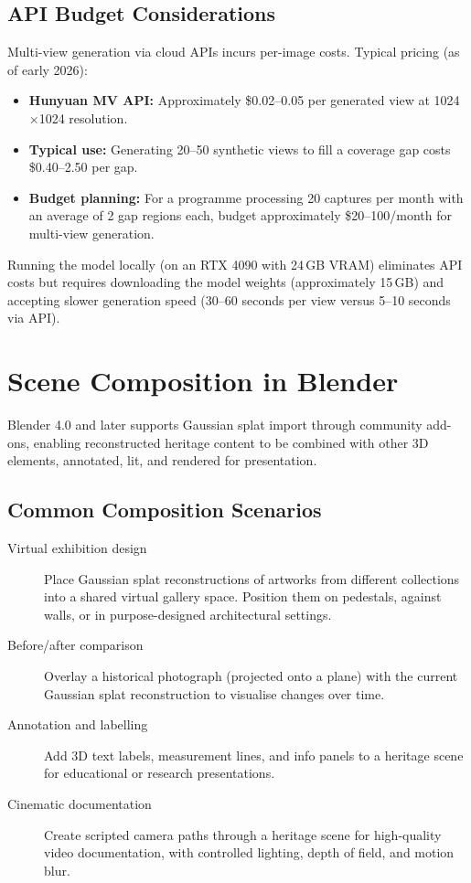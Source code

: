 \subsection{API Budget Considerations}

Multi-view generation via cloud APIs incurs per-image costs. Typical pricing (as of early 2026):

\begin{itemize}
  \item \textbf{Hunyuan MV API:} Approximately \$0.02--0.05 per generated view at 1024$\times$1024 resolution.
  \item \textbf{Typical use:} Generating 20--50 synthetic views to fill a coverage gap costs \$0.40--2.50 per gap.
  \item \textbf{Budget planning:} For a programme processing 20 captures per month with an average of 2 gap regions each, budget approximately \$20--100/month for multi-view generation.
\end{itemize}

Running the model locally (on an RTX 4090 with 24\,GB VRAM) eliminates API costs but requires downloading the model weights (approximately 15\,GB) and accepting slower generation speed (30--60 seconds per view versus 5--10 seconds via API).

\section{Scene Composition in Blender}
\label{sec:adv-blender}

Blender 4.0 and later supports Gaussian splat import through community add-ons, enabling reconstructed heritage content to be combined with other 3D elements, annotated, lit, and rendered for presentation.

\subsection{Common Composition Scenarios}

\begin{description}
  \item[Virtual exhibition design] Place Gaussian splat reconstructions of artworks from different collections into a shared virtual gallery space. Position them on pedestals, against walls, or in purpose-designed architectural settings.

  \item[Before/after comparison] Overlay a historical photograph (projected onto a plane) with the current Gaussian splat reconstruction to visualise changes over time.

  \item[Annotation and labelling] Add 3D text labels, measurement lines, and info panels to a heritage scene for educational or research presentations.

  \item[Cinematic documentation] Create scripted camera paths through a heritage scene for high-quality video documentation, with controlled lighting, depth of field, and motion blur.
\end{description}

